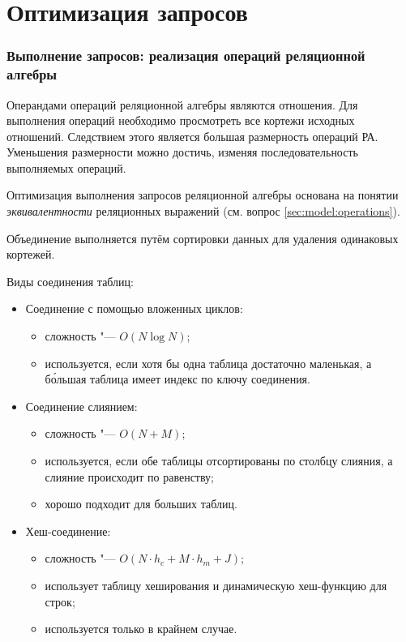 \part{Оптимизация запросов}

\section{Выполнение запросов: реализация операций реляционной алгебры}

Операндами операций реляционной алгебры являются отношения.
Для выполнения операций необходимо просмотреть все кортежи исходных отношений.
Следствием этого является большая размерность операций РА.
Уменьшения размерности можно достичь, изменяя последовательность выполняемых операций.

Оптимизация выполнения запросов реляционной алгебры основана на понятии \emph{эквивалентности} реляционных выражений (см. вопрос \ref{sec:model:operations}).

Объединение выполняется путём сортировки данных для удаления одинаковых кортежей.

Виды соединения таблиц:
\begin{itemize}
	\item Соединение с помощью вложенных циклов:
		\begin{itemize}
			\item сложность "--- $ O(N \log N) $;
			\item используется, если хотя бы одна таблица достаточно маленькая, а б\'ольшая таблица имеет индекс по ключу соединения.
		\end{itemize}
	\item Соединение слиянием:
		\begin{itemize}
			\item сложность "--- $ O(N + M) $;
			\item используется, если обе таблицы отсортированы по столбцу слияния, а слияние происходит по равенству;
			\item хорошо подходит для больших таблиц.
		\end{itemize}
	\item Хеш-соединение:
		\begin{itemize}
			\item сложность "--- $ O(N \cdot h_c + M \cdot h_m + J) $;
			\item использует таблицу хеширования и динамическую хеш-функцию для строк;
			\item используется только в крайнем случае.
		\end{itemize}
\end{itemize}

